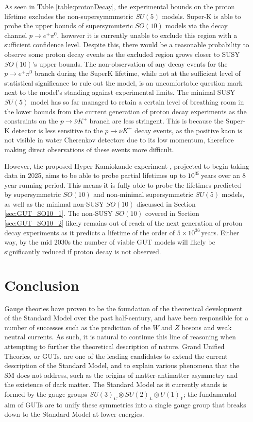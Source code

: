 \documentclass{article}
\begin{document}
As seen in Table \ref{table:protonDecay}, the experimental bounds on the proton lifetime excludes the non-supersymmmetric $SU(5)$ models. Super-K is able to probe the upper bounds of supersymmteric $SO(10)$ models via the decay channel $p\rightarrow e^+ \pi^0$, however it is currently unable to exclude this region with a sufficient confidence level. Despite this, there would be a reasonable probability to observe some proton decay events as the excluded region grows closer to SUSY $SO(10)$'s upper bounds. The non-observation of any decay events for the $p\rightarrow e^+ \pi^0$ branch during the SuperK lifetime, while not at the sufficient level of statistical significance to rule out the model, is an uncomfortable question mark next to the model's standing against experimental limits.
The minimal SUSY $SU(5)$ model has so far managed to retain a certain level of breathing room in the lower bounds from the current generation of proton decay experiments as the constraints on the $p\rightarrow \overline{\nu}K^+$ branch are less stringent. This is because the Super-K detector is less sensitive to the $p\rightarrow \overline{\nu}K^+$ decay events, as the positive kaon is not visible in water Cherenkov detectors due to its low momentum, therefore making direct observations of these events more difficult.

However, the  proposed Hyper-Kamiokande experiment \cite{HyperK}, projected to begin taking data in 2025, aims to be able to probe partial lifetimes up to $10^{35}\,$years over an 8 year running period. This means it is fully able to probe the lifetimes predicted by supersymmetric $SO(10)$ and non-minimal supersymmetric $SU(5)$ models, as well as the minimal non-SUSY $SO(10)$ discussed in Section \ref{sec:GUT_SO10_1}. The non-SUSY $SO(10)$ covered in Section \ref{sec:GUT_SO10_2} likely remains out of reach of the next generation of proton decay experiments as it predicts a lifetime of the order of $5\times10^{36}\,$years. Either way, by the mid 2030s the number of viable GUT models will likely be significantly reduced if proton decay is not observed.

\section{Conclusion}%
\label{sec:Conclusion}

Gauge theories have proven to be the foundation of the theoretical development of the Standard Model over the past half-century, and have been responsible for a number of successes such as the prediction of the $W$ and $Z$ bosons and weak neutral currents.  As such, it is natural to continue this line of reasoning when attempting to further the theoretical description of nature.
Grand Unified Theories, or GUTs, are one of the leading candidates to extend the current description of the Standard Model, and to explain various phenomena that the SM does not address, such as the origins of matter-antimatter asymmetry and the existence of dark matter. The Standard Model as it currently stands is formed by the gauge groups $SU(3)_C \otimes SU(2)_L \otimes U(1)_Y$; the fundamental aim of GUTs are to unify these symmetries into a single gauge group that breaks down to the Standard Model  at lower energies. 
\end{document}
